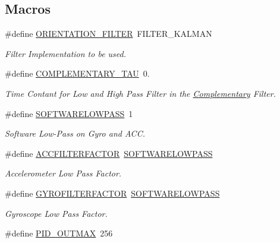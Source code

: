 \subsection*{Macros}
\begin{DoxyCompactItemize}
\item 
\#define \hyperlink{group__config_gaf45c761b3bd949068c77712e21259564}{O\-R\-I\-E\-N\-T\-A\-T\-I\-O\-N\-\_\-\-F\-I\-L\-T\-E\-R}~F\-I\-L\-T\-E\-R\-\_\-\-K\-A\-L\-M\-A\-N
\begin{DoxyCompactList}\small\item\em Filter Implementation to be used. \end{DoxyCompactList}\item 
\#define \hyperlink{group__config_ga61cd22949cc88bd899de6b20cb61e959}{C\-O\-M\-P\-L\-E\-M\-E\-N\-T\-A\-R\-Y\-\_\-\-T\-A\-U}~0.
\begin{DoxyCompactList}\small\item\em Time Contant for Low and High Pass Filter in the \hyperlink{struct_complementary}{Complementary} Filter. \end{DoxyCompactList}\item 
\#define \hyperlink{group__config_gaba06e7be57726e74f267a1622e7d720e}{S\-O\-F\-T\-W\-A\-R\-E\-L\-O\-W\-P\-A\-S\-S}~1
\begin{DoxyCompactList}\small\item\em Software Low-\/\-Pass on Gyro and A\-C\-C. \end{DoxyCompactList}\item 
\#define \hyperlink{group__config_gaace41596724b03f3f2b2ee28b7e87272}{A\-C\-C\-F\-I\-L\-T\-E\-R\-F\-A\-C\-T\-O\-R}~\hyperlink{group__config_gaba06e7be57726e74f267a1622e7d720e}{S\-O\-F\-T\-W\-A\-R\-E\-L\-O\-W\-P\-A\-S\-S}
\begin{DoxyCompactList}\small\item\em Accelerometer Low Pass Factor. \end{DoxyCompactList}\item 
\#define \hyperlink{group__config_ga1b5d47810976ecbfd688513246db3ba9}{G\-Y\-R\-O\-F\-I\-L\-T\-E\-R\-F\-A\-C\-T\-O\-R}~\hyperlink{group__config_gaba06e7be57726e74f267a1622e7d720e}{S\-O\-F\-T\-W\-A\-R\-E\-L\-O\-W\-P\-A\-S\-S}
\begin{DoxyCompactList}\small\item\em Gyroscope Low Pass Factor. \end{DoxyCompactList}\item 
\#define \hyperlink{group__config_gaf36e4eab421932a006c7df7e84f11cf0}{P\-I\-D\-\_\-\-O\-U\-T\-M\-A\-X}~256

\end{DoxyCompactItemize}
